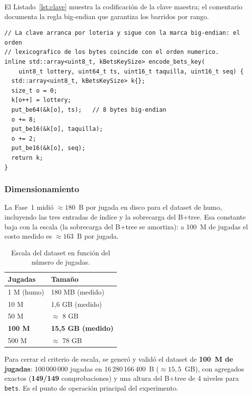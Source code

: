 \documentclass[12pt, letterpaper]{article}
\begin{document}
El Listado~\ref{lst:clave} muestra la codificación de la clave maestra; el
comentario documenta la regla big-endian que garantiza los barridos por
rango.

\begin{lstlisting}[language=Cpp17, caption={Codificación de la clave maestra (src/keys.h).}, label={lst:clave}]
// La clave arranca por loteria y sigue con la marca big-endian: el orden
// lexicografico de los bytes coincide con el orden numerico.
inline std::array<uint8_t, kBetsKeySize> encode_bets_key(
    uint8_t lottery, uint64_t ts, uint16_t taquilla, uint16_t seq) {
  std::array<uint8_t, kBetsKeySize> k{};
  size_t o = 0;
  k[o++] = lottery;
  put_be64(&k[o], ts);   // 8 bytes big-endian
  o += 8;
  put_be16(&k[o], taquilla);
  o += 2;
  put_be16(&k[o], seq);
  return k;
}
\end{lstlisting}

\subsubsection{Dimensionamiento}
\label{sec:dimensionamiento}

La Fase~1 midió $\approx 180$~B por jugada en disco para el dataset de humo,
incluyendo las tres entradas de índice y la sobrecarga del B+tree. Esa
constante baja con la escala (la sobrecarga del B+tree se amortiza): a
100~M de jugadas el costo medido es $\approx 163$~B por jugada.

\begin{table}[H]
\centering
\caption{Escala del dataset en función del número de jugadas.}
\label{tab:escala}
\begin{tabular}{@{}l l@{}}
\toprule
\textbf{Jugadas} & \textbf{Tamaño} \\
\midrule
1 M (humo) & 180 MB (medido) \\
10 M & 1,6 GB (medido) \\
50 M & $\approx$ 8 GB \\
\textbf{100 M} & \textbf{15,5 GB (medido)} \\
500 M & $\approx$ 78 GB \\
\bottomrule
\end{tabular}
\end{table}

Para cerrar el criterio de escala, se generó y validó el dataset de
\textbf{100~M de jugadas}: 100\,000\,000 jugadas en 16\,280\,166\,400~B
($\approx 15{,}5$~GB), con agregados exactos (\textbf{149/149} comprobaciones)
y una altura del B+tree de 4 niveles para \texttt{bets}. Es el punto de
operación principal del experimento.
\end{document}
